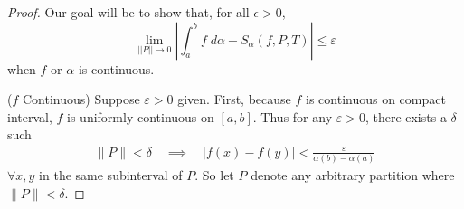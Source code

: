\documentclass[12pt]{article}
\numberwithin{equation}{section} %
\theoremstyle{plain}
\theoremstyle{definition}
\theoremstyle{remark}
\begin{document}
\begin{proof}
Our goal will be to show that, for all $\epsilon>0$,
\begin{equation}
    \label{contequiv.toshow}
    \lim_{||P||\rightarrow 0}
    \left\lvert \int^b_a f \; d\alpha - S_\alpha(f,P,T) \right\rvert
        \leq \varepsilon
\end{equation}
when $f$ or $\alpha$ is continuous.

($f$ Continuous)
Suppose $\varepsilon>0$ given.
First, because $f$ is continuous on compact interval, $f$ is uniformly
continuous on $[a,b]$. Thus for any $\varepsilon>0$, there exists a
$\delta$ such
\begin{align*}
  \lVert P\rVert <\delta
  \quad\implies\quad
  |f(x)-f(y)|<\frac{\varepsilon}{\alpha(b)-\alpha(a)}
\end{align*}
$\forall x,y$ in the same subinterval of $P$.
So let $P$ denote any arbitrary partition where $\lVert P\rVert<\delta$.


\end{proof}
\end{document}
